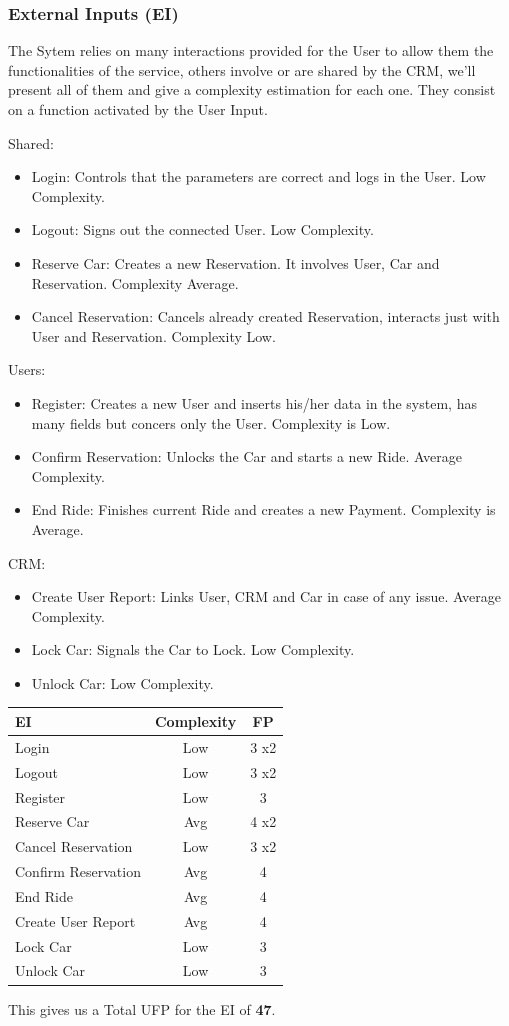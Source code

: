 \documentclass[a4paper]{article}
\begin{document}
\subsubsection{External Inputs (EI)}
The Sytem relies on many interactions provided for the User to allow them the functionalities of the service, others involve or are shared by the CRM, we'll present all of them and give a complexity estimation for each one. They consist on a function activated by the User Input.\newline
\par
Shared:
\begin{itemize}
\item Login: Controls that the parameters are correct and logs in the User. Low Complexity.
\item Logout: Signs out the connected User. Low Complexity.
\item Reserve Car: Creates a new Reservation. It involves User, Car and Reservation. Complexity Average.
\item Cancel Reservation: Cancels already created Reservation, interacts just with User and Reservation. Complexity Low.
\end{itemize}
Users:
\begin{itemize}
\item Register: Creates a new User and inserts his/her data in the system, has many fields but concers only the User. Complexity is Low.
\item Confirm Reservation: Unlocks the Car and starts a new Ride. Average Complexity.
\item End Ride: Finishes current Ride and creates a new Payment. Complexity is Average.
\end{itemize}
CRM:
\begin{itemize}
\item Create User Report: Links User, CRM and Car in case of any issue. Average Complexity.
\item Lock Car: Signals the Car to Lock. Low Complexity.
\item Unlock Car: Low Complexity.
\end{itemize}
\begin{center}
\begin{tabular}{ | l | c | c | }
\hline
	\textbf{EI} & \textbf{Complexity} & \textbf{FP} \\ \hline\hline
	Login & Low & 3 x2 \\ \hline
	Logout & Low & 3 x2 \\ \hline
	Register & Low & 3  \\ \hline
	Reserve Car & Avg & 4 x2  \\ \hline
	Cancel Reservation & Low & 3 x2 \\ \hline
	Confirm Reservation & Avg & 4 \\ \hline
	End Ride & Avg & 4 \\ \hline
	Create User Report & Avg &  4  \\ \hline
	Lock Car & Low & 3  \\ \hline
	Unlock Car & Low & 3  \\ \hline
\end{tabular}
\end{center}
This gives us a Total UFP for the EI of \textbf{47}.
\end{document}
